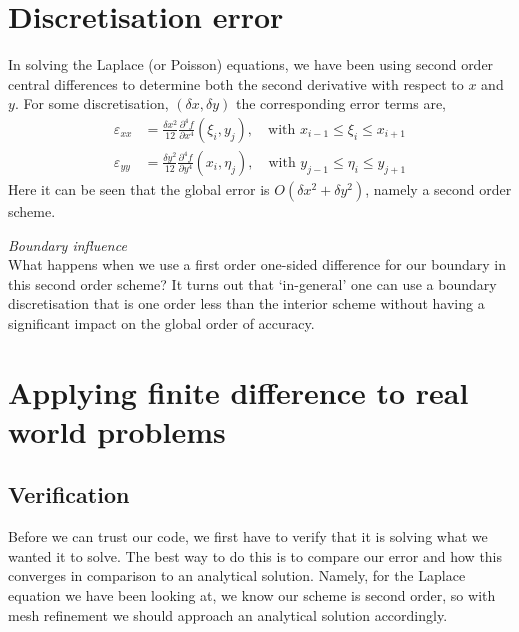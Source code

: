 \documentclass[11pt,a4paper]{report}
\theoremstyle{definition}
\begin{document}
\section{Discretisation error}
In solving the Laplace (or Poisson) equations, we have been using second order central differences to determine both the second derivative with respect to $x$ and $y$. For some discretisation, $(\delta x, \delta y)$ the corresponding error terms are,
\begin{align*}
	\varepsilon_{xx} &= \frac{\delta x^2}{12}\frac{\partial^4 f}{\partial x^4} (\xi_i,y_j),  \quad \text{with } x_{i-1} \leq \xi_i \leq x_{i+1} \\
	\varepsilon_{yy} &= \frac{\delta y^2}{12}\frac{\partial^4 f}{\partial y^4} (x_i,\eta_j), \quad \text{with } y_{j-1} \leq \eta_i \leq y_{j+1}
\end{align*}
Here it can be seen that the global error is $O(\delta x^2 + \delta y^2)$, namely a second order scheme.

\textit{Boundary influence} \\
What happens when we use a first order one-sided difference for our boundary in this second order scheme? It turns out that `in-general' one can use a boundary discretisation that is one order less than the interior scheme without having a significant impact on the global order of accuracy.

\section{Applying finite difference to real world problems}
\subsection{Verification}
Before we can trust our code, we first have to verify that it is solving what we wanted it to solve. The best way to do this is to compare our error and how this converges in comparison to an analytical solution. Namely, for the Laplace equation we have been looking at, we know our scheme is second order, so with mesh refinement we should approach an analytical solution accordingly.
\end{document}
